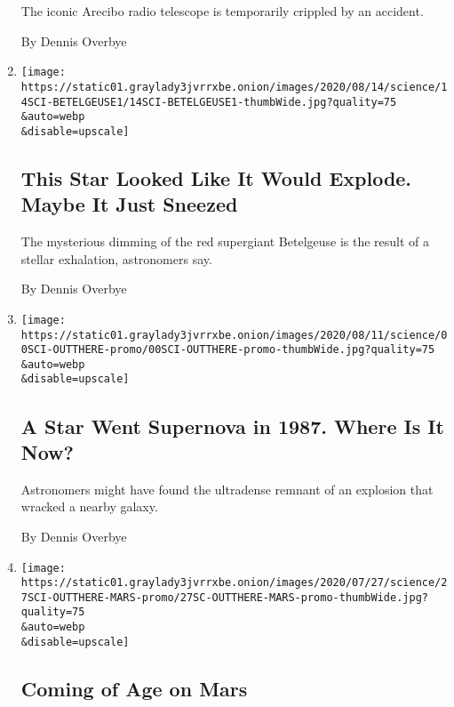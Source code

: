 \begin{enumerate}
  The iconic Arecibo radio telescope is temporarily crippled by an
  accident.

  By Dennis Overbye
\item
  \href{/2020/08/14/science/betelgeuse-star-supernova.html}{}

  \texttt{[image: https://static01.graylady3jvrrxbe.onion/images/2020/08/14/science/14SCI-BETELGEUSE1/14SCI-BETELGEUSE1-thumbWide.jpg?quality=75\\\&auto=webp\\\&disable=upscale]}

  \hypertarget{this-star-looked-like-it-would-explode-maybe-it-just-sneezed}{%
  \subsection{This Star Looked Like It Would Explode. Maybe It Just
  Sneezed}\label{this-star-looked-like-it-would-explode-maybe-it-just-sneezed}}

  The mysterious dimming of the red supergiant Betelgeuse is the result
  of a stellar exhalation, astronomers say.

  By Dennis Overbye
\item
  \href{/2020/08/07/science/supernova-neutron-star-sn1987a.html}{}

  \texttt{[image: https://static01.graylady3jvrrxbe.onion/images/2020/08/11/science/00SCI-OUTTHERE-promo/00SCI-OUTTHERE-promo-thumbWide.jpg?quality=75\\\&auto=webp\\\&disable=upscale]}

  \hypertarget{a-star-went-supernova-in-1987-where-is-it-now}{%
  \subsection{A Star Went Supernova in 1987. Where Is It
  Now?}\label{a-star-went-supernova-in-1987-where-is-it-now}}

  Astronomers might have found the ultradense remnant of an explosion
  that wracked a nearby galaxy.

  By Dennis Overbye
\item
  \href{/2020/07/27/science/mars-sarah-stewart-johnson.html}{}

  \texttt{[image: https://static01.graylady3jvrrxbe.onion/images/2020/07/27/science/27SCI-OUTTHERE-MARS-promo/27SC-OUTTHERE-MARS-promo-thumbWide.jpg?quality=75\\\&auto=webp\\\&disable=upscale]}

  \hypertarget{coming-of-age-on-mars}{%
  \subsection{Coming of Age on Mars}\label{coming-of-age-on-mars}}


\end{enumerate}
